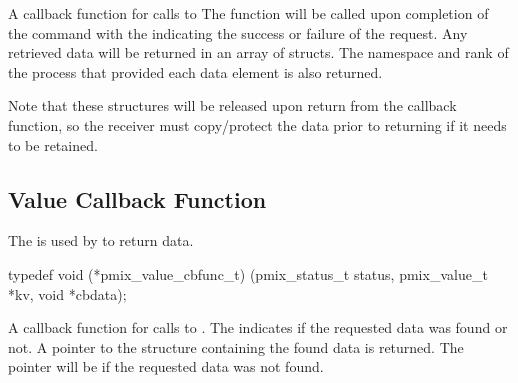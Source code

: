 \begin{arglist}
\end{arglist}


\descr

A callback function for calls to 
The function will be called upon completion of the command with the  indicating the success or failure of the request.
Any retrieved data will be returned in an array of  structs.
The namespace and rank of the process that provided each data element is also returned.

Note that these structures will be released upon return from the callback function, so the receiver must copy/protect the data prior to returning if it needs to be retained.


\subsection{Value Callback Function}

\summary

The  is used by  to return data.

\cspecificstart
\begin{codepar}
typedef void (*pmix_value_cbfunc_t)
    (pmix_status_t status,
     pmix_value_t *kv, void *cbdata);
\end{codepar}
\cspecificend

\begin{arglist}
\end{arglist}


\descr

A callback function for calls to .
The  indicates if the requested data was found or not.
A pointer to the  structure containing the found data is returned.
The pointer will be  if the requested data was not found.


